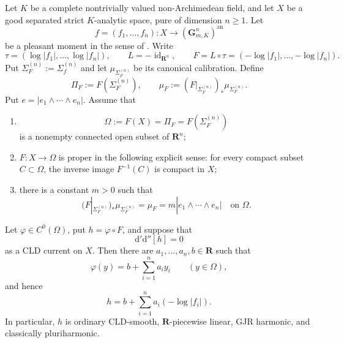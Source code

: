 
\begin{proposition}
\label{prop:p062-proper-full-rank-moment}
Let $K$ be a complete nontrivially valued non-Archimedean field, and let
$X$ be a good separated strict $K$-analytic space, pure of
dimension $n\geq 1$.  Let
\[
 f=(f_1,\ldots,f_n):X\longrightarrow(\mathbf G_{m,K}^{n})^{\mathrm{an}}
\]
be a pleasant moment in the sense of
\cite[Definition~14.1.7]{CLD25}.  Write
\[
 \tau=(\log|f_1|,\ldots,\log|f_n|),\qquad
 L=-\operatorname{id}_{\mathbf R^n},\qquad
 F=L\circ\tau=(-\log|f_1|,\ldots,-\log|f_n|).
\]
Put $\Sigma_F^{(n)}:=\Sigma_f^{(n)}$ and let
$\mu_{\Sigma_F^{(n)}}$ be its canonical calibration.  Define
\begin{equation}
\label{eq:p062-moment-explicit-pushforward-calibration}
 \Pi_F:=F(\Sigma_F^{(n)}),\qquad
 \mu_F:=
 (F|_{\Sigma_F^{(n)}})_*\mu_{\Sigma_F^{(n)}}.
\end{equation}
Put $e=|e_1\wedge\cdots\wedge e_n|$.  Assume that
\begin{enumerate}
\item\label{itm:p062-moment:image}
      \begin{equation}
      \label{eq:p062-moment-full-image}
      \Omega:=F(X)=\Pi_F=F(\Sigma_F^{(n)})
      \end{equation}
      is a nonempty connected open subset of $\mathbf R^n$;
\item\label{itm:p062-moment:proper}
      $F:X\to\Omega$ is proper in the following explicit sense: for every
      compact subset $C\subset\Omega$, the inverse image $F^{-1}(C)$ is
      compact in $X$;
\item\label{itm:p062-moment:calibration}
      there is a constant $m>0$ such that
      \begin{equation}
      \label{eq:p062-moment-constant-calibration}
       (F|_{\Sigma_F^{(n)}})_*\mu_{\Sigma_F^{(n)}}
       =\mu_F=m|e_1\wedge\cdots\wedge e_n|
       \quad\text{on }\Omega.
      \end{equation}
\end{enumerate}

Let $\varphi\in C^0(\Omega)$, put $h=\varphi\circ F$, and suppose that
\begin{equation}
\label{eq:p062-moment-zero-current}
                         \mathrm d'\mathrm d''[h]=0
\end{equation}
as a CLD current on $X$.  Then there are
$a_1,\ldots,a_n,b\in\mathbf R$ such that
\begin{equation}
\label{eq:p062-moment-affine-target}
                  \varphi(y)=b+\sum_{i=1}^n a_i y_i
                  \qquad(y\in\Omega),
\end{equation}
and hence
\begin{equation}
\label{eq:p062-moment-affine-source}
                  h=b+\sum_{i=1}^n a_i(-\log|f_i|).
\end{equation}
In particular, $h$ is ordinary CLD-smooth, $\mathbf R$-piecewise linear,
GJR harmonic, and classically pluriharmonic.


\end{proposition}
